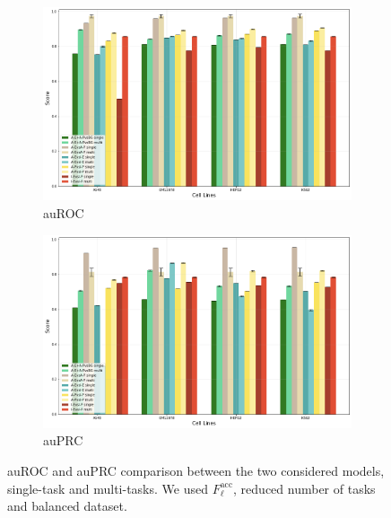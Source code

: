 \begin{figure}[!htbp]
    \centering
    \begin{subfigure}[b]{\textwidth}
        \includegraphics[width=\textwidth]{images/results_plots/auroc_4celllines_comparison.png}
        \caption{auROC}
        \label{fig:auroc_new_4celllines_comparison}
    \end{subfigure}
    \begin{subfigure}[b]{\textwidth}
        \includegraphics[width=\textwidth]{images/results_plots/auprc_4celllines_comparison.png}
        \caption{auPRC}
        \label{fig:auprc_new_4celllines_comparison}
    \end{subfigure}
   \caption{auROC and auPRC comparison between the two considered models, single-task and multi-tasks. We used $F_\ell^{\textrm{acc}}$, reduced number of tasks and balanced dataset.} 
   \label{fig:4celllines_comparison}
\end{figure}

